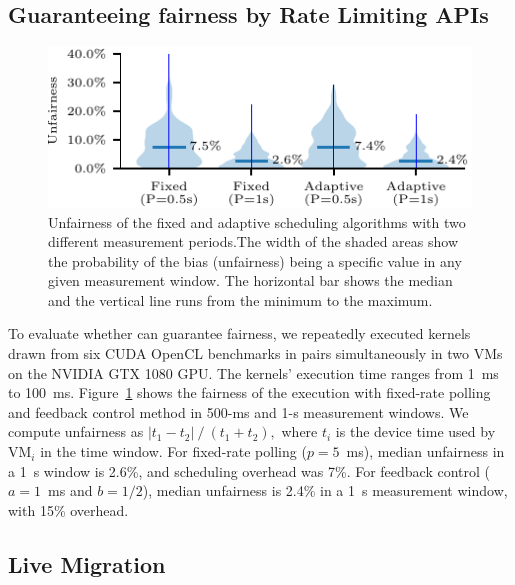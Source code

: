 \subsection{Guaranteeing fairness by Rate Limiting APIs}
\label{s:eval_rate_limit}

\begin{figure}[!!ht]
	\centering
    \includegraphics[width=0.7\linewidth]{ava/data/rate_limit/bias_plot.pdf}%
    \vspace{-.35em}
	\caption{Unfairness of the fixed and adaptive scheduling algorithms with two different measurement periods.The width of the shaded areas show the probability of the bias (unfairness) being a specific value in any given measurement window. The horizontal bar shows the median and the vertical line runs from the minimum to the maximum.}
	\label{fig:fairness}
\end{figure}

To evaluate whether \ava can guarantee fairness, we repeatedly executed
kernels drawn from six CUDA OpenCL benchmarks in pairs simultaneously in two
VMs on the NVIDIA GTX 1080 GPU. The kernels' execution time ranges from 1~ms
to 100~ms. Figure~\ref{fig:fairness} shows the fairness of the execution with
fixed-rate polling and feedback control method in 500-ms and 1-s measurement
windows. We compute unfairness as $\left|t_1-t_2\right| \mathbin{/} (t_1+t_2),$
where $t_i$ is the device time used by VM$_i$ in the time window.
For fixed-rate polling ($p=5$~ms), median unfairness in a \SI{1}{\second}
window is 2.6\%, and scheduling overhead was 7\%. For feedback control
($a=1$~ms and $b=1/2$), median unfairness is 2.4\% in a \SI{1}{\second}
measurement window, with 15\% overhead.


\subsection{Live Migration}

